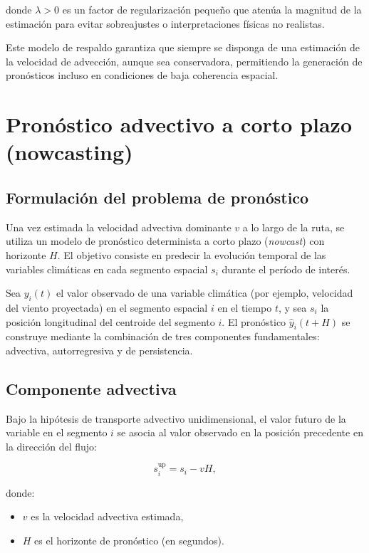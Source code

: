 \documentclass[
  spanish,
  us-letterpaper,
]{scrreprt}
\providecommand{\tightlist}{%
  \setlength{\itemsep}{0pt}\setlength{\parskip}{0pt}}
\numberwithin{equation}{section}
\begin{document}
donde \(\lambda > 0\) es un factor de regularización pequeño que atenúa
la magnitud de la estimación para evitar sobreajustes o interpretaciones
físicas no realistas.

Este modelo de respaldo garantiza que siempre se disponga de una
estimación de la velocidad de advección, aunque sea conservadora,
permitiendo la generación de pronósticos incluso en condiciones de baja
coherencia espacial.

\section{Pronóstico advectivo a corto plazo
(nowcasting)}\label{sec-pronosticoadvectivo}

\subsection{Formulación del problema de
pronóstico}\label{formulaciuxf3n-del-problema-de-pronuxf3stico}

Una vez estimada la velocidad advectiva dominante \(v\) a lo largo de la
ruta, se utiliza un modelo de pronóstico determinista a corto plazo
(\emph{nowcast}) con horizonte \(H\). El objetivo consiste en predecir
la evolución temporal de las variables climáticas en cada segmento
espacial \(s_i\) durante el período de interés.

Sea \(y_i(t)\) el valor observado de una variable climática (por
ejemplo, velocidad del viento proyectada) en el segmento espacial \(i\)
en el tiempo \(t\), y sea \(s_i\) la posición longitudinal del centroide
del segmento \(i\). El pronóstico \(\hat{y}_i(t+H)\) se construye
mediante la combinación de tres componentes fundamentales: advectiva,
autorregresiva y de persistencia.

\subsection{Componente advectiva}\label{componente-advectiva}

Bajo la hipótesis de transporte advectivo unidimensional, el valor
futuro de la variable en el segmento \(i\) se asocia al valor observado
en la posición precedente en la dirección del flujo:

\[
s_i^{\text{up}} = s_i - vH,
\]

donde:

\begin{itemize}
\tightlist
\item
  \(v\) es la velocidad advectiva estimada,
\item
  \(H\) es el horizonte de pronóstico (en segundos).
\end{itemize}
\end{document}
